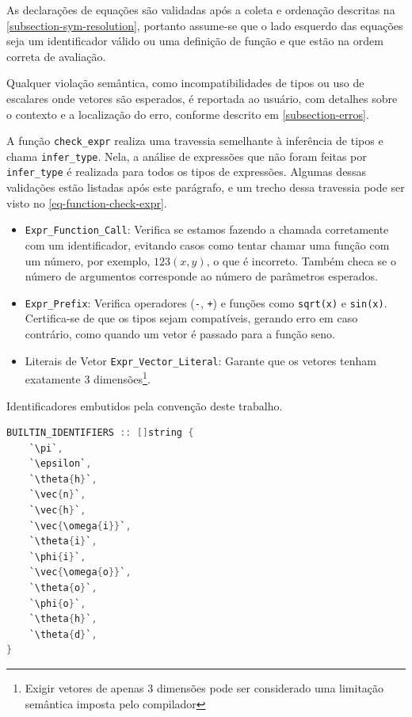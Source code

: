 As declarações de equações são validadas após a coleta e ordenação descritas na \autoref{subsection-sym-resolution}, portanto assume-se que o lado esquerdo das equações seja um identificador válido ou uma definição de função e que estão na ordem correta de avaliação.

Qualquer violação semântica, como incompatibilidades de tipos ou uso de escalares onde vetores são esperados, é reportada ao usuário, com detalhes sobre o contexto e a localização do erro, conforme descrito em \autoref{subsection-erros}.

A função \verb"check_expr" realiza uma travessia semelhante à inferência de tipos e chama \texttt{infer\_type}. Nela, a análise de expressões que não foram feitas por \texttt{infer\_type} é realizada para todos os tipos de expressões. Algumas dessas validações estão listadas após este parágrafo, e um trecho dessa travessia pode ser visto no \autoref{eq-function-check-expr}.

\begin{itemize}
    \item \verb`Expr_Function_Call`: Verifica se estamos fazendo a chamada corretamente com um identificador, evitando casos como tentar chamar uma função com um número, por exemplo, $123(x,y)$, o que é incorreto. Também checa se o número de argumentos corresponde ao número de parâmetros esperados.
    \item \verb`Expr_Prefix`: Verifica operadores (\verb`-`, \verb`+`) e funções como \verb`sqrt(x)` e \verb`sin(x)`. Certifica-se de que os tipos sejam compatíveis, gerando erro em caso contrário, como quando um vetor é passado para a função seno.
    \item Literais de Vetor \verb`Expr_Vector_Literal`: Garante que os vetores tenham exatamente 3 dimensões\footnote{Exigir vetores de apenas 3 dimensões pode ser considerado uma limitação semântica imposta pelo compilador}.
\end{itemize}




\begin{codigo}[H]
    \caption{\small Identificadores embutidos pela convenção deste trabalho.}
    \label{cod-builtins}
\begin{lstlisting}[language=C, numbers=none, frame=none, inputencoding=latin1]
BUILTIN_IDENTIFIERS :: []string {
    `\pi`,
    `\epsilon`,
    `\theta{h}`,
    `\vec{n}`,
    `\vec{h}`,
    `\vec{\omega{i}}`,
    `\theta{i}`,
    `\phi{i}`,
    `\vec{\omega{o}}`,
    `\theta{o}`,
    `\phi{o}`,
    `\theta{h}`,
    `\theta{d}`,
}
\end{lstlisting}
\end{codigo}



